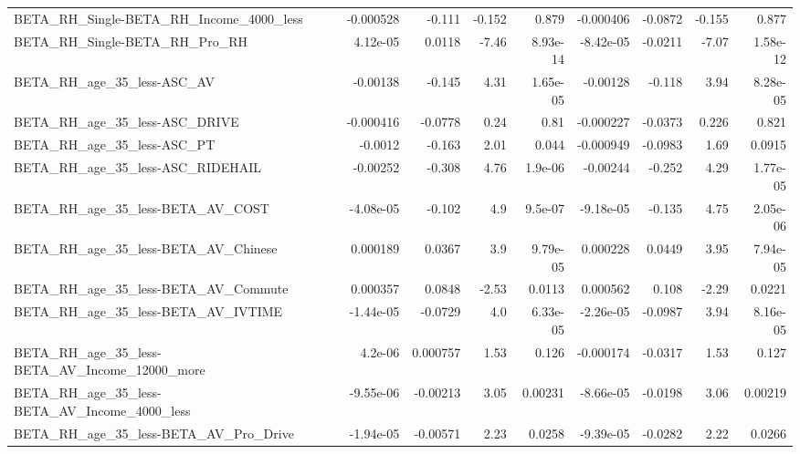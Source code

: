 \begin{tabular}{lrrrrrrrr}
BETA\_RH\_Single-BETA\_RH\_Income\_4000\_less            &   -0.000528 &       -0.111 &    -0.152 &    0.879 &  -0.000406 &     -0.0872 &       -0.155 &         0.877 \\
BETA\_RH\_Single-BETA\_RH\_Pro\_RH                      &    4.12e-05 &       0.0118 &     -7.46 & 8.93e-14 &  -8.42e-05 &     -0.0211 &        -7.07 &      1.58e-12 \\
BETA\_RH\_age\_35\_less-ASC\_AV                         &    -0.00138 &       -0.145 &      4.31 & 1.65e-05 &   -0.00128 &      -0.118 &         3.94 &      8.28e-05 \\
BETA\_RH\_age\_35\_less-ASC\_DRIVE                      &   -0.000416 &      -0.0778 &      0.24 &     0.81 &  -0.000227 &     -0.0373 &        0.226 &         0.821 \\
BETA\_RH\_age\_35\_less-ASC\_PT                         &     -0.0012 &       -0.163 &      2.01 &    0.044 &  -0.000949 &     -0.0983 &         1.69 &        0.0915 \\
BETA\_RH\_age\_35\_less-ASC\_RIDEHAIL                   &    -0.00252 &       -0.308 &      4.76 &  1.9e-06 &   -0.00244 &      -0.252 &         4.29 &      1.77e-05 \\
BETA\_RH\_age\_35\_less-BETA\_AV\_COST                   &   -4.08e-05 &       -0.102 &       4.9 &  9.5e-07 &  -9.18e-05 &      -0.135 &         4.75 &      2.05e-06 \\
BETA\_RH\_age\_35\_less-BETA\_AV\_Chinese                &    0.000189 &       0.0367 &       3.9 & 9.79e-05 &   0.000228 &      0.0449 &         3.95 &      7.94e-05 \\
BETA\_RH\_age\_35\_less-BETA\_AV\_Commute                &    0.000357 &       0.0848 &     -2.53 &   0.0113 &   0.000562 &       0.108 &        -2.29 &        0.0221 \\
BETA\_RH\_age\_35\_less-BETA\_AV\_IVTIME                 &   -1.44e-05 &      -0.0729 &       4.0 & 6.33e-05 &  -2.26e-05 &     -0.0987 &         3.94 &      8.16e-05 \\
BETA\_RH\_age\_35\_less-BETA\_AV\_Income\_12000\_more      &     4.2e-06 &     0.000757 &      1.53 &    0.126 &  -0.000174 &     -0.0317 &         1.53 &         0.127 \\
BETA\_RH\_age\_35\_less-BETA\_AV\_Income\_4000\_less       &   -9.55e-06 &     -0.00213 &      3.05 &  0.00231 &  -8.66e-05 &     -0.0198 &         3.06 &       0.00219 \\
BETA\_RH\_age\_35\_less-BETA\_AV\_Pro\_Drive              &   -1.94e-05 &     -0.00571 &      2.23 &   0.0258 &  -9.39e-05 &     -0.0282 &         2.22 &        0.0266 \\

\end{tabular}
